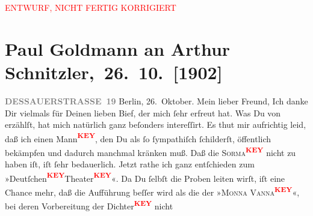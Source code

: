 
\begin{center}
            \textcolor{red}{ENTWURF, NICHT FERTIG KORRIGIERT}
                      \end{center}
            
         \renewcommand{\erwaehnteOrte}{Orte: Berlin, Dessauer Straße, Wien}
         \renewcommand{\erwaehnteWerke}{}
               \section[ Paul Goldmann an Arthur Schnitzler, 26. 10. {[}1902{]}]{ Paul Goldmann an Arthur Schnitzler, 26. 10. {[}1902{]}}\nopagebreak{}\rehead{ }\begin{ledgroupsized}[t]{13cm}\normalsize\beginnumbering \toendnotes[C]{\smallbreak\pagebreak[2]} 
\toendnotes[C]{\smallbreak}\pstart
           \noindent{}\raggedleft{}{\pb}\textcolor{gray}{\textbf{DESSAUERSTRASSE 19}}\pend
           \pstart
           Berlin, 26. Oktober.\pend
           \pstart\center{}Mein lieber Freund,\pend\pstart
           Ich danke Dir vielmals für Deinen lieben Bief, der mich ſehr erfreut hat. Was Du
                    von \label{XXXXv}\label{XXXX} erzählſt, hat mich natürlich ganz
                    beſonders intereſſirt. Es thut mir aufrichtig leid, daß ich einen Mann\textcolor{red}{\textsuperscript{\textbf{KEY}}}, den Du als ſo ſympathiſch ſchilderſt,
                    öffentlich bekämpfen und dadurch manchmal kränken muß. {\pb}\pend
           \pstart
           Daß die \textsc{Sorma\textcolor{red}{\textsuperscript{\textbf{KEY}}}} nicht zu haben iſt, iſt ſehr bedauerlich. Jetzt rathe ich \strikeout{\textcolor{gray}{ſelbſt}} ganz entſchieden zum »Deutſchen\textcolor{red}{\textsuperscript{\textbf{KEY}}}Theater\textcolor{red}{\textsuperscript{\textbf{KEY}}}«. Da Du ſelbſt die Proben leiten wirſt, iſt
                    eine Chance mehr, daß die Aufführung beſſer wird als die der »\textsc{Monna Vanna\textcolor{red}{\textsuperscript{\textbf{KEY}}}}«, bei deren Vorbereitung der Dichter\textcolor{red}{\textsuperscript{\textbf{KEY}}} nicht

\end{ledgroupsized}
